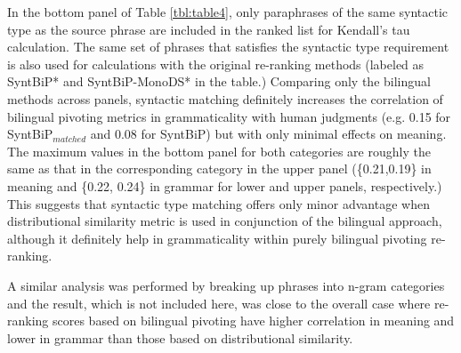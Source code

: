 \documentclass[11pt]{article}
\begin{document}
In the bottom panel of Table \ref{tbl:table4}, only paraphrases of the same syntactic type as the source phrase are included in the ranked list for Kendall's tau calculation. The same set of phrases that satisfies the syntactic type requirement is also used for calculations with the original re-ranking methods (labeled as SyntBiP* and SyntBiP-MonoDS* in the table.) Comparing only the bilingual methods across panels, syntactic matching definitely increases the correlation of bilingual pivoting metrics in grammaticality with human judgments (e.g. 0.15 for SyntBiP$_{matched}$ and 0.08 for SyntBiP) but with only minimal effects on meaning. The maximum values in the bottom panel for both categories are roughly the same as that in the corresponding category in the upper panel (\{0.21,0.19\} in meaning and \{0.22, 0.24\} in grammar for lower and upper panels, respectively.) This suggests that syntactic type matching offers only minor advantage when distributional similarity metric is used in conjunction of the bilingual approach, although it definitely help in grammaticality within purely bilingual pivoting re-ranking.

A similar analysis was performed by breaking up phrases into n-gram categories and the result, which is not included here, was close to the overall case where re-ranking scores based on bilingual pivoting have higher correlation in meaning and lower in grammar than those based on distributional similarity.


\end{document}
